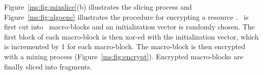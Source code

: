 \begin{dfn}
\end{dfn}

Figure~\ref{ms:fig:mixslice}(b) illustrates the slicing process and Figure~\ref{ms:fig:algoenc} illustrates the procedure for encrypting a resource \resource. \resource\ is first cut into \Mnum\ macro-blocks and an initialization vector is randomly chosen. The first block of each macro-block is then {\sc xor}-ed with the initialization vector, which is incremented by 1 for each macro-block. The macro-block is then encrypted with a mixing process (Figure~\ref{ms:fig:encrypt}). Encrypted macro-blocks are finally sliced into fragments.
